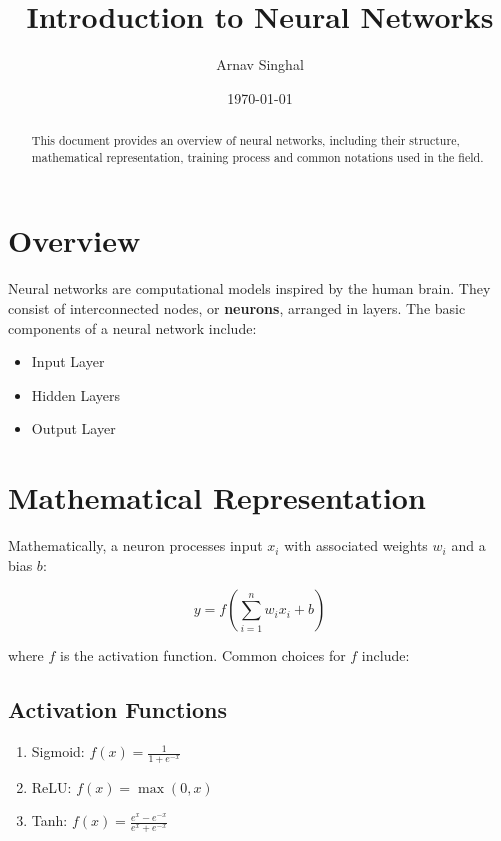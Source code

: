 \documentclass{article}
\begin{document}
\title{Introduction to Neural Networks}
\author{Arnav Singhal}
\date{\today}
\maketitle

\begin{abstract}
This document provides an overview of neural networks, including their structure, mathematical representation, training process and common notations used in the field.
\end{abstract}

\tableofcontents

\section{Overview} \label{sec:overview}
Neural networks are computational models inspired by the human brain. They consist of interconnected nodes, or \textbf{neurons}, arranged in layers. The basic components of a neural network include:

\begin{itemize}
    \item Input Layer
    \item Hidden Layers
    \item Output Layer
\end{itemize}

\section{Mathematical Representation} \label{sec:math}
Mathematically, a neuron processes input $x_i$ with associated weights $w_i$ and a bias $b$:

\begin{equation} \label{eq:neuron}
    y = f\left( \sum_{i=1}^{n} w_i x_i + b \right)
\end{equation}

where $f$ is the activation function. Common choices for $f$ include:

\subsection{Activation Functions} \label{subsec:activation}
\begin{enumerate}
    \item Sigmoid: $f(x) = \frac{1}{1+e^{-x}}$
    \item ReLU: $f(x) = \max(0, x)$
    \item Tanh: $f(x) = \frac{e^x - e^{-x}}{e^x + e^{-x}}$
\end{enumerate}
\end{document}

